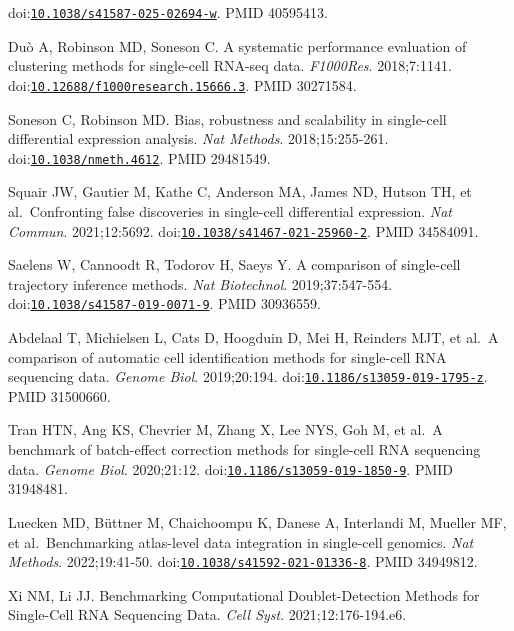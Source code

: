 \documentclass[11pt]{article}
\begin{document}
\begin{enumerate}[label={[\arabic*]},leftmargin=2.6em,labelsep=0.5em,itemsep=1.5pt]
  doi:\href{https://doi.org/10.1038/s41587-025-02694-w}{\nolinkurl{10.1038/s41587-025-02694-w}}.
  PMID 40595413.
\item
  Duò A, Robinson MD, Soneson C. A systematic performance evaluation of
  clustering methods for single-cell RNA-seq data. \emph{F1000Res}.
  2018;7:1141.
  doi:\href{https://doi.org/10.12688/f1000research.15666.3}{\nolinkurl{10.12688/f1000research.15666.3}}.
  PMID 30271584.
\item
  Soneson C, Robinson MD. Bias, robustness and scalability in
  single-cell differential expression analysis. \emph{Nat Methods}.
  2018;15:255-261.
  doi:\href{https://doi.org/10.1038/nmeth.4612}{\nolinkurl{10.1038/nmeth.4612}}.
  PMID 29481549.
\item
  Squair JW, Gautier M, Kathe C, Anderson MA, James ND, Hutson TH, et
  al.~Confronting false discoveries in single-cell differential
  expression. \emph{Nat Commun}. 2021;12:5692.
  doi:\href{https://doi.org/10.1038/s41467-021-25960-2}{\nolinkurl{10.1038/s41467-021-25960-2}}.
  PMID 34584091.
\item
  Saelens W, Cannoodt R, Todorov H, Saeys Y. A comparison of single-cell
  trajectory inference methods. \emph{Nat Biotechnol}. 2019;37:547-554.
  doi:\href{https://doi.org/10.1038/s41587-019-0071-9}{\nolinkurl{10.1038/s41587-019-0071-9}}.
  PMID 30936559.
\item
  Abdelaal T, Michielsen L, Cats D, Hoogduin D, Mei H, Reinders MJT, et
  al.~A comparison of automatic cell identification methods for
  single-cell RNA sequencing data. \emph{Genome Biol}. 2019;20:194.
  doi:\href{https://doi.org/10.1186/s13059-019-1795-z}{\nolinkurl{10.1186/s13059-019-1795-z}}.
  PMID 31500660.
\item
  Tran HTN, Ang KS, Chevrier M, Zhang X, Lee NYS, Goh M, et al.~A
  benchmark of batch-effect correction methods for single-cell RNA
  sequencing data. \emph{Genome Biol}. 2020;21:12.
  doi:\href{https://doi.org/10.1186/s13059-019-1850-9}{\nolinkurl{10.1186/s13059-019-1850-9}}.
  PMID 31948481.
\item
  Luecken MD, Büttner M, Chaichoompu K, Danese A, Interlandi M, Mueller
  MF, et al.~Benchmarking atlas-level data integration in single-cell
  genomics. \emph{Nat Methods}. 2022;19:41-50.
  doi:\href{https://doi.org/10.1038/s41592-021-01336-8}{\nolinkurl{10.1038/s41592-021-01336-8}}.
  PMID 34949812.
\item
  Xi NM, Li JJ. Benchmarking Computational Doublet-Detection Methods for
  Single-Cell RNA Sequencing Data. \emph{Cell Syst}. 2021;12:176-194.e6.

\end{enumerate}
\end{document}

